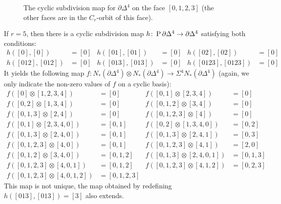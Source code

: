 \begin{figure}
    \caption{The cyclic subdivision map for $\partial \Delta^4$ on the face $[0,1,2,3]$ (the other faces are in the $C_r$-orbit of this face).}
    \label{fig:my_label}
\end{figure}

If $r=5$, then there is a cyclic subdivision map $h\colon \operatorname{P} \partial \Delta^4\to \partial \Delta^4$ satisfying both conditions:
\begin{align*}
    h([0],[0]) &= [0] &
	h([01],[01]) &= [0] &
	h([02],[02]) &= [0] \\
	h([012],[012]) &= [0] &
	h([013],[013]) &= [0] &
	h([0123],[0123]) &= [0]
\end{align*}
It yields the following map $f\colon N_*(\partial \Delta^4)\otimes N_*(\partial \Delta^4)\to \Sigma^4N_*(\partial \Delta^4)$ (again, we only indicate the non-zero values of $f$ on a cyclic basis):
\begin{align*}
	f([0]\otimes[1,2,3,4]) &= [0] &
	f([0,1]\otimes [2,3,4]) &= [0] \\
	f([0,2]\otimes [1,3,4]) &= [0] &
	f([0,1,2]\otimes [3,4]) &= [0] \\
	f([0,1,3]\otimes [2,4]) &= [0] &
	f([0,1,2,3]\otimes [4]) &= [0] \\
	f([0,1]\otimes [2,3,4,0]) &= [0,1] &
	f([0,2]\otimes [1,3,4,0]) &= [0,2] \\
	f([0,1,3]\otimes [2,4,0]) &= [0,1] &
	f([0,1,3]\otimes [2,4,1]) &= [0,3] \\
	f([0,1,2,3]\otimes [4,0]) &= [0,1] &
	f([0,1,2,3]\otimes [4,1]) &= [2,0] \\
	f([0,1,2]\otimes [3,4,0]) &= [0,1,2] &
	f([0,1,3]\otimes [2,4,0,1]) &= [0,1,3] \\
	f([0,1,2,3]\otimes [4,0,1]) &= [0,1,2] &
	f([0,1,2,3]\otimes [4,1,2]) &= [0,2,3] \\
	f([0,1,2,3]\otimes [4,0,1,2]) &= [0,1,2,3]
\end{align*}
This map is not unique, the map obtained by redefining $h([013],[013]) = [3]$ also extends.

